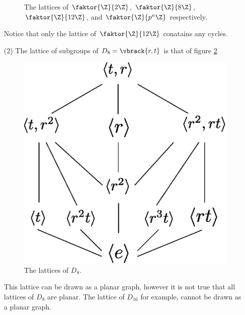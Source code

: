 \begin{example}
\begin{enumerate}
\begin{figure}[h]
                \caption{The lattices of $\faktor{\Z}{2\Z}$, $\faktor{\Z}{8\Z}$,
                $\faktor{\Z}{12\Z}$, and  $\faktor{\Z}{p^n\Z}$ respectively.}
                \label{fig_2.1}
            \end{figure}
            Notice that only the lattice of $\faktor{\Z}{12\Z}$ conatains any
            cycles.

        \item[(2)] The lattice of subgroups of $D_8=\vbrack{r,t}$ is that of
            figure \ref{fig_2.2}
            \begin{figure}[h]
                \centering
                \includegraphics[scale = 0.5]{Figures/Chapter2/D_8_lattice.eps}
                \caption{The lattices of $D_8$.}
                \label{fig_2.2}
            \end{figure}
            This lattice can be drawn as a planar graph, however it is not true
            that all lattices of $D_8$ are planar. The lattice of $D_{16}$
            for example, cannot be drawn as a planar graph.


\end{enumerate}
\end{example}
